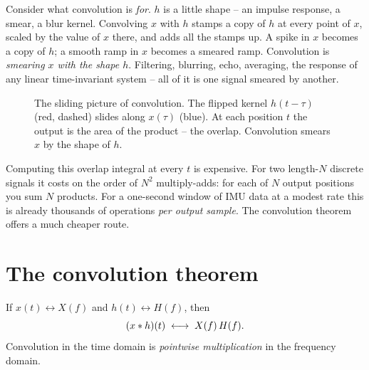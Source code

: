 \begin{happeningbox}
Consider what convolution is \emph{for}. $h$ is
a little shape -- an impulse response, a smear, a blur kernel. Convolving $x$
with $h$ stamps a copy of $h$ at every point of $x$, scaled by the value of $x$
there, and adds all the stamps up. A spike in $x$ becomes a copy of $h$; a
smooth ramp in $x$ becomes a smeared ramp. Convolution is \emph{smearing $x$ with
the shape $h$}. Filtering, blurring, echo, averaging, the response of any linear
time-invariant system -- all of it is one signal smeared by another.
\end{happeningbox}

\begin{figure}[H]
\centering
{}
\caption{The sliding picture of convolution. The flipped kernel $h(t-\tau)$
(red, dashed) slides along $x(\tau)$ (blue). At each position $t$ the output is
the area of the product -- the overlap. Convolution smears $x$ by the shape of
$h$.}
\label{ch11:fig-conv-slide}
\end{figure}

Computing this overlap integral at every $t$ is expensive. For two length-$N$
discrete signals it costs on the order of $N^2$ multiply-adds: for each of $N$
output positions you sum $N$ products. For a one-second window of IMU data at a
modest rate this is already thousands of operations \emph{per output sample}.
The convolution theorem offers a much cheaper route.

\section{The convolution theorem}
\label{ch11:conv-theorem}

\begin{theorem}
\label{ch11:thm-conv}
If $x(t) \longleftrightarrow X(f)$ and $h(t) \longleftrightarrow H(f)$, then
\[
(x \ast h)(t) \;\longleftrightarrow\; X(f)\,H(f).
\]
Convolution in the time domain is \emph{pointwise multiplication} in the
frequency domain.
\end{theorem}

